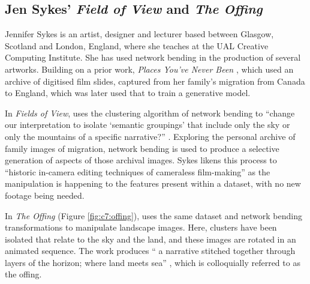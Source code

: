 \subsection{Jen Sykes' \textit{Field of View} and \textit{The Offing}}

Jennifer Sykes is an artist, designer and lecturer based between Glasgow, Scotland and London, England, where she teaches at the UAL Creative Computing Institute.
She has used network bending in the production of several artworks. Building on a prior work, \textit{Places You’ve Never Been} \citep{sykes2018places}, which used an archive of digitised film slides, captured from her family's migration from Canada to England, which was later used that to train a generative model. 

In \textit{Fields of View}, uses the clustering algorithm of network bending to “change our interpretation to isolate ‘semantic groupings’ that include only the sky or only the mountains of a specific narrative?” \citep{sykes2021fields}. 
Exploring the personal archive of family images of migration, network bending is used to produce a selective generation of aspects of those archival images. 
Sykes likens this process to “historic in-camera editing techniques of cameraless film-making” \citep{sykes2021fields} as the manipulation is happening to the features present within a dataset, with no new footage being needed.

In \textit{The Offing} (Figure \ref{fig:c7:offing}), uses the same dataset and network bending transformations to manipulate landscape images. 
Here, clusters have been isolated that relate to the sky and the land, and these images are rotated in an animated sequence. 
The work produces “ a narrative stitched together through layers of the horizon; where land meets sea”  \cite{sykes2022offing}, which is colloquially referred to as the offing. 

